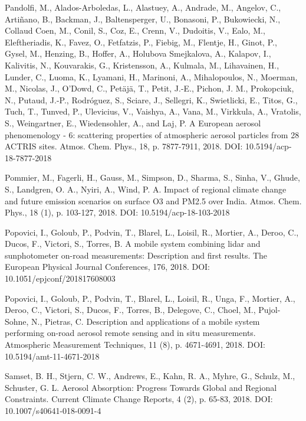 \begin{list}{}{\setlength{\leftmargin}{15pt}\setlength{\itemindent}{-\leftmargin}}
\item[]
Pandolfi, M., Alados-Arboledas, L., Alastuey, A., Andrade, M., Angelov, C., Arti\~{n}ano, B., Backman, J., Baltensperger, U., Bonasoni, P., Bukowiecki, N., Collaud Coen, M., Conil, S., Coz, E., Crenn, V., Dudoitis, V., Ealo, M., Eleftheriadis, K., Favez, O., Fetfatzis, P., Fiebig, M., Flentje, H., Ginot, P., Gysel, M., Henzing, B., Hoffer, A., Holubova Smejkalova, A., Kalapov, I., Kalivitis, N., Kouvarakis, G., Kristensson, A., Kulmala, M., Lihavainen, H., Lunder, C., Luoma, K., Lyamani, H., Marinoni, A., Mihalopoulos, N., Moerman, M., Nicolas, J., O'Dowd, C., Pet\"{a}j\"{a}, T., Petit, J.-E., Pichon, J. M., Prokopciuk, N., Putaud, J.-P., Rodr\'{o}guez, S., Sciare, J., Sellegri, K., Swietlicki, E., Titos, G., Tuch, T., Tunved, P., Ulevicius, V., Vaishya, A., Vana, M., Virkkula, A., Vratolis, S., Weingartner, E., Wiedensohler, A., and Laj, P.
A European aerosol phenomenology - 6: scattering properties of atmospheric aerosol particles from 28 ACTRIS sites. 
Atmos. Chem. Phys., 18, p. 7877-7911, 2018.
DOI: 10.5194/acp-18-7877-2018

\item[]
Pommier, M., Fagerli, H., Gauss, M., Simpson, D., Sharma, S., Sinha, V., Ghude, S., Landgren, O. A., Nyiri, A., Wind, P. A. 
Impact of regional climate change and future emission scenarios on surface O3 and PM2.5 over India. 
Atmos. Chem. Phys., 18 (1), p. 103-127, 2018. 
DOI: 10.5194/acp-18-103-2018

\item[]
Popovici, I., Goloub, P., Podvin, T., Blarel, L., Loisil, R., Mortier, A., Deroo, C., Ducos, F., Victori, S., Torres, B. 
A mobile system combining lidar and sunphotometer on-road measurements: Description and first results. 
The European Physical Journal Conferences, 176, 2018. 
DOI: 10.1051/epjconf/201817608003

\item[]
Popovici, I., Goloub, P., Podvin, T., Blarel, L., Loisil, R., Unga, F., Mortier, A., Deroo, C., Victori, S., Ducos, F., Torres, B., Delegove, C., Choel, M., Pujol-Sohne, N., Pietras, C. 
Description and applications of a mobile system performing on-road aerosol remote sensing and in situ measurements. 
Atmospheric Measurement Techniques, 11 (8), p. 4671-4691, 2018. 
DOI: 10.5194/amt-11-4671-2018

\item[]
Samset, B. H., Stjern, C. W., Andrews, E., Kahn, R. A., Myhre, G., Schulz, M., Schuster, G. L. 
Aerosol Absorption: Progress Towards Global and Regional Constraints. 
Current Climate Change Reports, 4 (2), p. 65-83, 2018. 
DOI: 10.1007/s40641-018-0091-4


\end{list}
